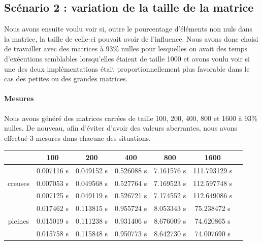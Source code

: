\documentclass[12pt,a4paper]{article}
\begin{document}
\subsection{Scénario 2 : variation de la taille de la matrice}

Nous avons ensuite voulu voir si, outre le pourcentage d'éléments non nuls dans la matrice, la taille de celle-ci pouvait avoir de l'influence. Nous avons donc choisi de travailler avec des matrices à 93\% nulles pour lesquelles on avait des temps d'exécutions semblables lorsqu'elles étaient de taille 1000 et avons voulu voir si une des deux implémentations était proportionnellement plus favorable dans le cas des petites ou des grandes matrices.

\paragraph{Mesures}
Nous avons généré des matrices carrées de taille 100, 200, 400, 800 et 1600 à 93\% nulles. De nouveau, afin d'éviter d'avoir des valeurs aberrantes, nous avons effectué 3 mesures dans chacune des situations. \\

\begin{tabular}{|*{7}{c|}}
    \hline
       & 100  & 200  & 400  & 800  & 1600\\
    \hline
    \multirow{3}{*}{creuses}  & 0.007116  s & 0.049152  s & 0.526088  s & 7.161576  s & 111.793129 s\\
    & 0.007053 s & 0.049568 s & 0.527764 s & 7.169523 s & 112.597748 s\\
    & 0.007125  s & 0.049119 s &0.526721 s & 7.174552 s & 112.649086 s\\
    \hline
     \multirow{3}{*}{pleines} & 0.017462 s & 0.113815 s & 0.955724 s  &  8.053343 s & 75.238472 s\\
    & 0.015019 s & 0.111238 s & 0.931406 s & 8.676009 s & 74.620865 s\\
    & 0.015758 s & 0.115848 s & 0.950773 s & 8.642730 s & 74.007690 s\\
    \hline
\end{tabular}
\end{document}
